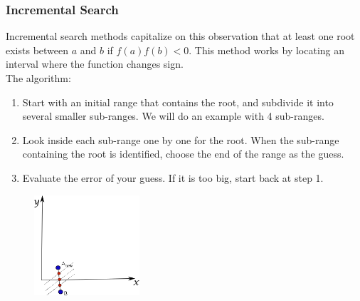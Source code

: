 \documentclass{if-beamer}
\begin{document}
\begin{frame}
\frametitle{Incremental Search}
Incremental search methods capitalize on this observation that at least one root exists between $a$ and $b$ if $f(a)f(b)<0$. This method works by locating an interval where the function changes sign.  \\
\vspace{0.25cm}
The algorithm:
\begin{enumerate}
	\item Start with an initial range that contains the root, and subdivide it into several smaller sub-ranges. We will do an example with 4 sub-ranges.
	\item Look inside each sub-range one by one for the root. When the sub-range containing the root is identified, choose the end of the range as the guess.
	\item Evaluate the error of your guess. If it is too big, start back at step 1. 
\end{enumerate}
\begin{figure}
	\centering
	\includegraphics[width = 0.35\textwidth]{figures/incremental3}
\end{figure}
\end{frame}
\end{document}

